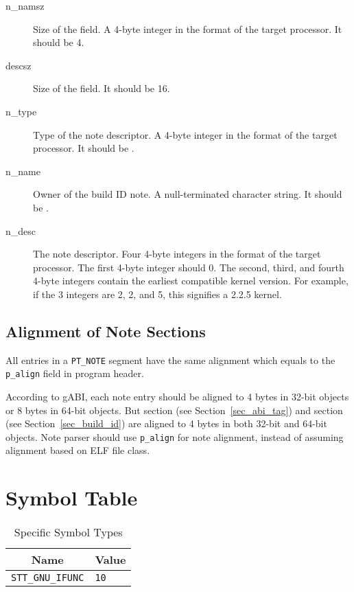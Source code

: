 \begin{description}
 \item[n_namsz] Size of the  field.  A 4-byte integer in the
   format of the target processor.  It should be 4.
 \item[descsz] Size of the  field.  It should be 16.
 \item[n_type] Type of the note descriptor.  A 4-byte integer in the format
   of the target processor.  It should be .
 \item[n_name] Owner of the build ID note.  A null-terminated character
   string.  It should be .
 \item[n_desc] The note descriptor. Four 4-byte integers in the format of
   the target processor.  The first 4-byte integer should 0.  The second,
   third, and fourth 4-byte integers contain the earliest compatible
   kernel version.  For example, if the 3 integers are 2, 2, and 5, this
   signifies a 2.2.5 kernel.
\end{description}

\subsection{Alignment of Note Sections}

All entries in a \texttt{PT_NOTE} segment have the same alignment which
equals to the {\tt p_align} field in program header.

According to gABI, each note entry should be aligned to 4 bytes in
32-bit objects or 8 bytes in 64-bit objects.  But 
section (see Section~\ref{sec_abi_tag}) and 
section (see Section~\ref{sec_build_id}) are aligned to 4 bytes in
both 32-bit and 64-bit objects.  Note parser should use {\tt p_align}
for note alignment, instead of assuming alignment based on ELF file class.

\section{Symbol Table}

\begin{table}[H]
\Hrule
  \caption{\xOS Specific Symbol Types}
  \label{ifunc}
  \begin{center}
    \begin{tabular}[t]{l|l}
      \multicolumn{1}{c}{Name} & \multicolumn{1}{c}{Value} \\
      \hline
      \texttt{STT_GNU_IFUNC} & \texttt{10}
    \end{tabular}
  \end{center}
\Hrule
\end{table}

